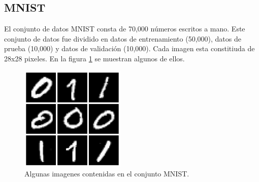 \subsection{MNIST}

El conjunto de datos MNIST consta de 70,000 números escritos a mano. Este conjunto de datos fue dividido en datos de entrenamiento (50,000), datos de prueba (10,000) y datos de validación (10,000). Cada imagen esta constitiuda de 28x28 pixeles. En la figura \ref{fig:mnist} se muestran algunos de ellos.

\begin{figure}[H]
    \centering
    \includegraphics[width=5cm]{Graphics/mnist.png}
    \caption{Algunas imagenes contenidas en el conjunto MNIST.}
    \label{fig:mnist}
\end{figure}